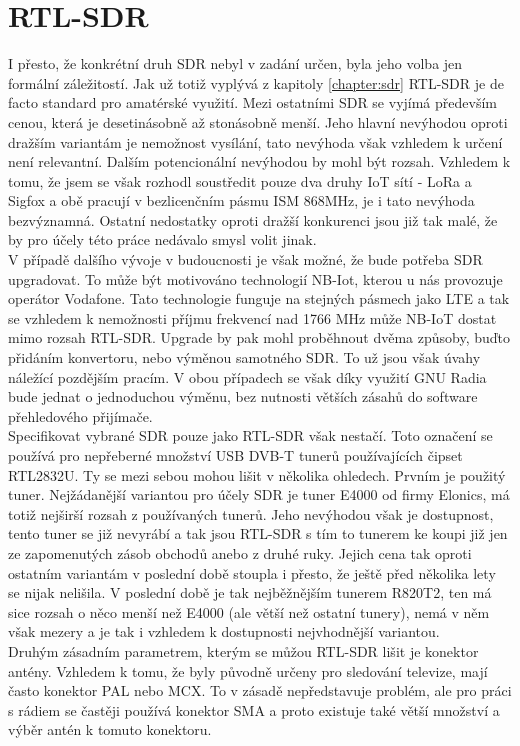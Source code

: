\documentclass{ctuthesis}
\begin{document}
\section{RTL-SDR} \label{hwrtlsdr}

I přesto, že konkrétní druh SDR nebyl v zadání určen, byla jeho volba jen formální záležitostí. Jak už totiž vyplývá z kapitoly \ref{chapter:sdr} RTL-SDR je de facto standard pro amatérské využití. Mezi ostatními SDR se vyjímá především cenou, která je desetinásobně až stonásobně menší. Jeho hlavní nevýhodou oproti dražším variantám je nemožnost vysílání, tato nevýhoda však vzhledem k určení není relevantní. Dalším potencionální nevýhodou by mohl být rozsah. Vzhledem k tomu, že jsem se však rozhodl soustředit pouze dva druhy IoT sítí - LoRa a Sigfox a obě pracují v bezlicenčním pásmu ISM 868MHz, je i tato nevýhoda bezvýznamná. Ostatní nedostatky oproti dražší konkurenci jsou již tak malé, že by pro účely této práce nedávalo smysl volit jinak.\\
V případě dalšího vývoje v budoucnosti je však možné, že bude potřeba SDR upgradovat. To může být motivováno technologií NB-Iot, kterou u nás provozuje operátor Vodafone. Tato technologie funguje na stejných pásmech jako LTE a tak se vzhledem k nemožnosti příjmu frekvencí nad 1766 MHz může NB-IoT dostat mimo rozsah RTL-SDR. Upgrade by pak mohl proběhnout dvěma způsoby, buďto přidáním konvertoru, nebo výměnou samotného SDR. To už jsou však úvahy náležící pozdějším pracím. V obou případech se však díky využití GNU Radia bude jednat o jednoduchou výměnu, bez nutnosti větších zásahů do software přehledového přijímače.\\
Specifikovat vybrané SDR pouze jako RTL-SDR však nestačí. Toto označení se používá pro nepřeberné množství USB DVB-T tunerů používajících čipset RTL2832U. Ty se mezi sebou mohou lišit v několika ohledech. Prvním je použitý tuner. Nejžádanější variantou pro účely SDR je tuner E4000 od firmy Elonics, má totiž nejširší rozsah z používaných tunerů. \cite{osmocom} Jeho nevýhodou však je dostupnost, tento tuner se již nevyrábí a tak jsou RTL-SDR s tím to tunerem ke koupi již jen ze zapomenutých zásob obchodů anebo z druhé ruky. Jejich cena tak oproti ostatním variantám v poslední době stoupla i přesto, že ještě před několika lety se nijak nelišila. V poslední době je tak nejběžnějším tunerem R820T2, ten má sice rozsah o něco menší než E4000 (ale větší než ostatní tunery), nemá v něm však mezery a je tak i vzhledem k dostupnosti nejvhodnější variantou.\\
Druhým zásadním parametrem, kterým se můžou RTL-SDR lišit je konektor antény. Vzhledem k tomu, že byly původně určeny pro sledování televize, mají často konektor PAL nebo MCX. \cite{rtlsdrcom} To v zásadě nepředstavuje problém, ale pro práci s rádiem se častěji používá konektor SMA a proto existuje také větší množství a výběr antén k tomuto konektoru.\\
\end{document}
